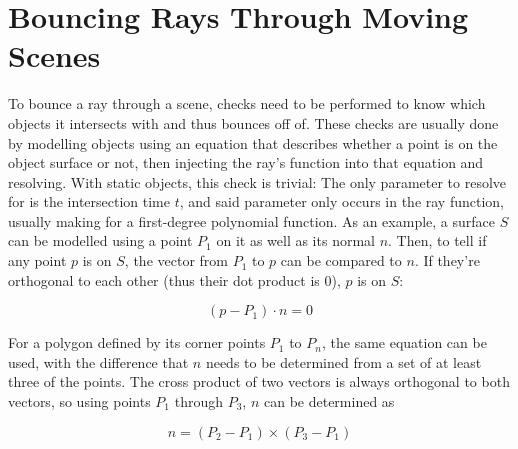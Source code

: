 \chapter{Bouncing Rays Through Moving Scenes}

To bounce a ray through a scene, checks need to be performed to know which objects it intersects with and thus bounces off of.
These checks are usually done by modelling objects using an equation that describes whether a point is on the object surface or not,
then injecting the ray's function into that equation and resolving.
With static objects, this check is trivial:
The only parameter to resolve for is the intersection time \(t\), and said parameter only occurs in the ray function,
usually making for a first-degree polynomial function.
\newline
As an example, a surface \(S\) can be modelled using a point \(P_1\) on it as well as its normal \(n\).
Then, to tell if any point \(p\) is on \(S\), the vector from \(P_1\) to \(p\) can be compared to \(n\).
If they're orthogonal to each other (thus their dot product is 0), \(p\) is on \(S\):

\begin{equation}\label{StaticSurface}
    (p - P_1) \cdot n = 0
\end{equation}

For a polygon defined by its corner points \(P_{1}\) to \(P_{n}\), the same equation can be used,
with the difference that \(n\) needs to be determined from a set of at least three of the points.
The cross product of two vectors is always orthogonal to both vectors, so using points \(P_{1}\) through \(P_{3}\),
\(n\) can be determined as

\begin{equation}\label{PolygonNormal}
    n = (P_{2} - P_{1}) \times (P_{3} - P_{1})
\end{equation}

